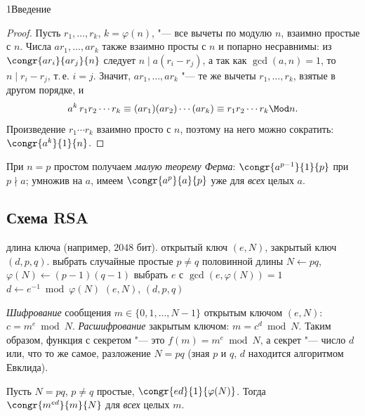 \begin{lecture}{1}{Введение}
\begin{proof}
Пусть $r_1, \dots, r_k$, $k = \varphi(n)$, "--- все вычеты по модулю $n$, взаимно простые с $n$.
Числа $a r_1, \dots, a r_k$ также взаимно просты с $n$ и попарно несравнимы: из
$\congr{a r_i}{a r_j}{n}$ следует $n \mid a(r_i - r_j)$, а так как $\gcd(a, n) = 1$, то
$n \mid r_i - r_j$, т.\,е. $i = j$. Значит, $a r_1, \dots, a r_k$ "--- те же вычеты
$r_1, \dots, r_k$, взятые в другом порядке, и
\[
  a^k \, r_1 r_2 \cdots r_k \equiv (a r_1)(a r_2) \cdots (a r_k) \equiv r_1 r_2 \cdots r_k
  \Mod n.
\]
Произведение $r_1 \cdots r_k$ взаимно просто с $n$, поэтому на него можно сократить:
$\congr{a^k}{1}{n}$.
\end{proof}

При $n = p$ простом получаем \emph{малую теорему Ферма}: $\congr{a^{p-1}}{1}{p}$ при
$p \nmid a$; умножив на $a$, имеем $\congr{a^p}{a}{p}$ уже для \emph{всех} целых $a$.

\subsection{Схема RSA}

\begin{algorithm}\label{l1:rsa-keygen}
\begin{algorithmic}[1]
\Require длина ключа (например, $2048$ бит).
\Ensure открытый ключ $(e, N)$, закрытый ключ $(d, p, q)$.
\State выбрать случайные простые $p \ne q$ половинной длины 
\State $N \gets pq$, \quad $\varphi(N) \gets (p - 1)(q - 1)$
\State выбрать $e$ с $\gcd(e, \varphi(N)) = 1$ 
\State $d \gets e^{-1} \bmod \varphi(N)$ 
\State \Return $(e, N)$, $(d, p, q)$
\end{algorithmic}
\end{algorithm}

\emph{Шифрование} сообщения $m \in \{0, 1, \dots, N - 1\}$ открытым ключом $(e, N)$:
$c = m^e \bmod N$. \emph{Расшифрование} закрытым ключом: $m = c^d \bmod N$. Таким образом,
функция с секретом "--- это $f(m) = m^e \bmod N$, а секрет "--- число $d$ или, что то же самое,
разложение $N = pq$ (зная $p$ и $q$, $d$ находится алгоритмом Евклида).

\begin{theorem}\label{l1:rsa-correct}
Пусть $N = pq$, $p \ne q$ простые, $\congr{ed}{1}{\varphi(N)}$. Тогда
$\congr{m^{ed}}{m}{N}$ для \emph{всех} целых $m$.
\end{theorem}


\end{lecture}

